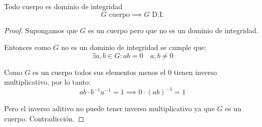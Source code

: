\begin{thm}
    Todo cuerpo es dominio de integridad
    \begin{equation}
        G \text{ cuerpo} \implies G \text{ D.I.}
    \end{equation}
    \label{thm:cuerpo-di}
\end{thm}

\begin{proof}
    Supongamos que $G$ es un cuerpo pero que no es un dominio de integridad.

    Entonces como $G$ no es un dominio de integridad se cumple que:
    \begin{equation}
        \exists a, b \in G : ab = 0 \quad a,b \neq 0
    \end{equation}

    Como $G$ es un cuerpo todos sus elementos menos el $0$ tienen inverso multiplicativo, por lo tanto:
    \begin{equation}
        ab \cdot b^{-1}a^{-1} = 1 \implies 0 \cdot (ab)^{-1} = 1 
    \end{equation}

    Pero el inverso aditivo no puede tener inverso multiplicativo ya que $G$ es un cuerpo. Contradicción.
\end{proof}
